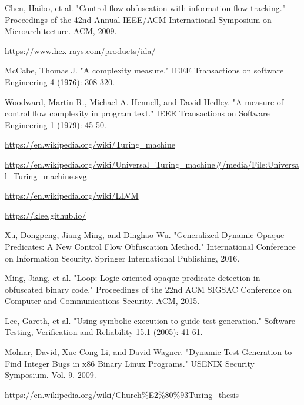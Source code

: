 \documentclass[lnicst]{svmultln}
\begin{document}
\begin{thebibliography}{5}
 Chen, Haibo, et al. "Control flow obfuscation with information flow tracking." Proceedings of the 42nd Annual IEEE/ACM International Symposium on Microarchitecture. ACM, 2009.

 \url{https://www.hex-rays.com/products/ida/}

 McCabe, Thomas J. "A complexity measure." IEEE Transactions on software Engineering 4 (1976): 308-320.

 Woodward, Martin R., Michael A. Hennell, and David Hedley. "A measure of control flow complexity in program text." IEEE Transactions on Software Engineering 1 (1979): 45-50.

 \url{https://en.wikipedia.org/wiki/Turing_machine}

 \url{https://en.wikipedia.org/wiki/Universal_Turing_machine#/media/File:Universal_Turing_machine.svg}

 \url{https://en.wikipedia.org/wiki/LLVM}

 \url{https://klee.github.io/}

 Xu, Dongpeng, Jiang Ming, and Dinghao Wu. "Generalized Dynamic Opaque Predicates: A New Control Flow Obfuscation Method." International Conference on Information Security. Springer International Publishing, 2016.

 Ming, Jiang, et al. "Loop: Logic-oriented opaque predicate detection in obfuscated binary code." Proceedings of the 22nd ACM SIGSAC Conference on Computer and Communications Security. ACM, 2015.

 Lee, Gareth, et al. "Using symbolic execution to guide test generation." Software Testing, Verification and Reliability 15.1 (2005): 41-61.

 Molnar, David, Xue Cong Li, and David Wagner. "Dynamic Test Generation to Find Integer Bugs in x86 Binary Linux Programs." USENIX Security Symposium. Vol. 9. 2009.

 \url{https://en.wikipedia.org/wiki/Church%E2%80%93Turing_thesis}


\end{thebibliography}
%
\end{document}
